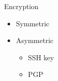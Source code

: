 \documentclass[aspectratio=169,10pt,t]{beamer}
\begin{document}
\begin{frame}[t]{Encryption}
	\begin{itemize}
		\item Symmetric
			\begin{itemize}
			\end{itemize}
		\item Asymmetric 
			\begin{itemize}
				\item SSH key
				\item PGP
			\end{itemize}
	\end{itemize}
\end{frame}
\end{document}
